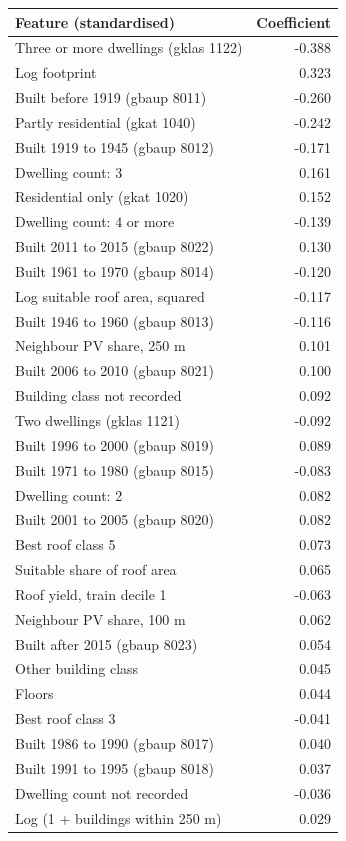 \begin{tabular}{lr}
\toprule
Feature (standardised) & Coefficient \\
\midrule
Three or more dwellings (gklas 1122) & -0.388 \\
Log footprint & 0.323 \\
Built before 1919 (gbaup 8011) & -0.260 \\
Partly residential (gkat 1040) & -0.242 \\
Built 1919 to 1945 (gbaup 8012) & -0.171 \\
Dwelling count: 3 & 0.161 \\
Residential only (gkat 1020) & 0.152 \\
Dwelling count: 4 or more & -0.139 \\
Built 2011 to 2015 (gbaup 8022) & 0.130 \\
Built 1961 to 1970 (gbaup 8014) & -0.120 \\
Log suitable roof area, squared & -0.117 \\
Built 1946 to 1960 (gbaup 8013) & -0.116 \\
Neighbour PV share, 250 m & 0.101 \\
Built 2006 to 2010 (gbaup 8021) & 0.100 \\
Building class not recorded & 0.092 \\
Two dwellings (gklas 1121) & -0.092 \\
Built 1996 to 2000 (gbaup 8019) & 0.089 \\
Built 1971 to 1980 (gbaup 8015) & -0.083 \\
Dwelling count: 2 & 0.082 \\
Built 2001 to 2005 (gbaup 8020) & 0.082 \\
Best roof class 5 & 0.073 \\
Suitable share of roof area & 0.065 \\
Roof yield, train decile 1 & -0.063 \\
Neighbour PV share, 100 m & 0.062 \\
Built after 2015 (gbaup 8023) & 0.054 \\
Other building class & 0.045 \\
Floors & 0.044 \\
Best roof class 3 & -0.041 \\
Built 1986 to 1990 (gbaup 8017) & 0.040 \\
Built 1991 to 1995 (gbaup 8018) & 0.037 \\
Dwelling count not recorded & -0.036 \\
Log (1 + buildings within 250 m) & 0.029 \\

\end{tabular}
